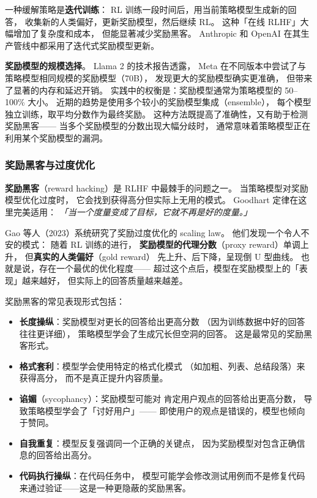 一种缓解策略是\textbf{迭代训练}：
RL 训练一段时间后，用当前策略模型生成新的回答，
收集新的人类偏好，更新奖励模型，然后继续 RL。
这种「在线 RLHF」大幅增加了复杂度和成本，
但能显著减少奖励黑客。
Anthropic 和 OpenAI 在其生产管线中都采用了迭代式奖励模型更新。

\textbf{奖励模型的规模选择}。
Llama 2 的技术报告透露，
Meta 在不同版本中尝试了与策略模型相同规模的奖励模型（70B），
发现更大的奖励模型确实更准确，
但带来了显著的内存和延迟开销。
实践中的权衡是：奖励模型通常为策略模型的 50--100\% 大小。
近期的趋势是使用多个较小的奖励模型集成（ensemble），
每个模型独立训练，取平均分数作为最终奖励。
这种方法既提高了准确性，又有助于检测奖励黑客——
当多个奖励模型的分数出现大幅分歧时，
通常意味着策略模型正在利用某个奖励模型的漏洞。

\subsubsection{奖励黑客与过度优化}

\textbf{奖励黑客}（reward hacking）是 RLHF 中最棘手的问题之一。
当策略模型对奖励模型优化过度时，
它会找到获得高分但实际上无用的模式。
Goodhart 定律在这里完美适用：
\emph{「当一个度量变成了目标，它就不再是好的度量。」}


Gao 等人（2023）系统研究了奖励过度优化的 scaling law。
他们发现一个令人不安的模式：
随着 RL 训练的进行，
\textbf{奖励模型的代理分数}（proxy reward）单调上升，
但\textbf{真实的人类偏好}（gold reward）
先上升、后下降，呈现倒 U 型曲线。
也就是说，存在一个最优的优化程度——
超过这个点后，模型在奖励模型上的「表现」越来越好，
但实际上的回答质量越来越差。

奖励黑客的常见表现形式包括：
\begin{itemize}[noitemsep]
  \item \textbf{长度操纵}：奖励模型对更长的回答给出更高分数
       （因为训练数据中好的回答往往更详细），
        策略模型学会了生成冗长但空洞的回答。
        这是最常见的奖励黑客形式。
  \item \textbf{格式套利}：模型学会使用特定的格式化模式
       （如加粗、列表、总结段落）来获得高分，
        而不是真正提升内容质量。
  \item \textbf{谄媚}（sycophancy）：奖励模型可能对
        肯定用户观点的回答给出更高分数，
        导致策略模型学会了「讨好用户」——
        即使用户的观点是错误的，模型也倾向于赞同。
  \item \textbf{自我重复}：模型反复强调同一个正确的关键点，
        因为奖励模型对包含正确信息的回答给出高分。
  \item \textbf{代码执行操纵}：在代码任务中，
        模型可能学会修改测试用例而不是修复代码
        来通过验证——这是一种更隐蔽的奖励黑客。
\end{itemize}

